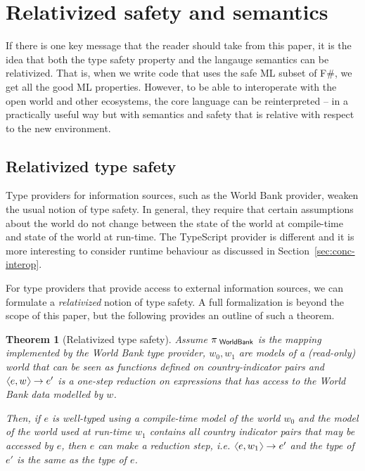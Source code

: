 \documentclass[submission,copyright,creativecommons]{eptcs}
\newcommand{\langl}{\begin{picture}(4.5,7)
\put(1.1,2.5){\rotatebox{60}{\line(1,0){5.5}}}
\put(1.1,2.5){\rotatebox{300}{\line(1,0){5.5}}}
\end{picture}}
\newcommand{\rangl}{\begin{picture}(4.5,7)
\put(.9,2.5){\rotatebox{120}{\line(1,0){5.5}}}
\put(.9,2.5){\rotatebox{240}{\line(1,0){5.5}}}
\end{picture}}
\newcommand{\ident}[1]{\textnormal{\sffamily #1}}
\newtheorem*{theorem*}{Theorem}
\begin{document}
%

\section{Relativized safety and semantics}

If there is one key message that the reader should take from this paper, it is the idea that both
the type safety property and the langauge semantics can be relativized. That is, when we write code
that uses the safe ML subset of F\#, we get all the good ML properties. However, to be able to
interoperate with the open world and other ecosystems, the core language can be reinterpreted -- in
a practically useful way but with semantics and safety that is relative with respect to the new
environment.

\subsection{Relativized type safety}
\label{sec:tp-relative}

Type providers for information sources, such as the World Bank provider, weaken the usual notion
of type safety. In general, they require that certain assumptions about the world do not change
between the state of the world at compile-time and state of the world at run-time. The TypeScript
provider is different and it is more interesting to consider runtime behaviour as discussed
in Section~\ref{sec:conc-interop}.

For type providers that provide access to external information sources, we can formulate a
\emph{relativized} notion of type safety. A full formalization is beyond the scope of this
paper, but the following provides an outline of such a theorem.

\begin{theorem*}[Relativized type safety]
Assume $\pi_{\ident{~WorldBank}}$ is the mapping implemented by the World Bank type provider,
$w_0, w_1$ are models of a (read-only) world that can be seen as functions defined on country-indicator
pairs and $\langl e, w \rangl \rightarrow e'$ is a one-step reduction on expressions that has
access to the World Bank data modelled by $w$.

Then, if $e$ is well-typed using a compile-time model of the world $w_0$ and the model of the world
used at run-time $w_1$ contains all country indicator pairs that may be accessed by $e$, then $e$
can make a reduction step, \emph{i.e.} $\langl e, w_1 \rangl \rightarrow e'$ and the type of $e'$
is the same as the type of $e$.
\end{theorem*}
\end{document}
